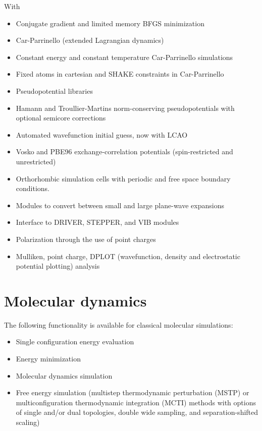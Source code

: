 With

\begin{itemize}
\item Conjugate gradient and limited memory BFGS minimization
\item Car-Parrinello (extended Lagrangian dynamics)
\item Constant energy and constant temperature Car-Parrinello simulations
\item Fixed atoms in cartesian and SHAKE constraints in Car-Parrinello
\item Pseudopotential libraries
\item Hamann and Troullier-Martins norm-conserving pseudopotentials with 
optional semicore corrections
\item Automated wavefunction initial guess, now with LCAO
\item Vosko and PBE96 exchange-correlation potentials (spin-restricted 
and unrestricted)
\item Orthorhombic simulation cells with periodic and
free space boundary conditions.
\item Modules to convert between small and large plane-wave expansions
\item Interface to DRIVER, STEPPER, and VIB modules
\item Polarization through the use of point charges
\item Mulliken, point charge, DPLOT (wavefunction, density and electrostatic
potential plotting) analysis
\end{itemize}


\section{Molecular dynamics}

The following functionality is available for classical molecular
simulations:
\begin{itemize}
\item Single configuration energy evaluation
\item Energy minimization
\item Molecular dynamics simulation
\item Free energy simulation  (multistep thermodynamic perturbation (MSTP) or
    multiconfiguration thermodynamic integration (MCTI) methods with
    options of single and/or dual topologies, double wide sampling, and
    separation-shifted scaling)
\end{itemize}

